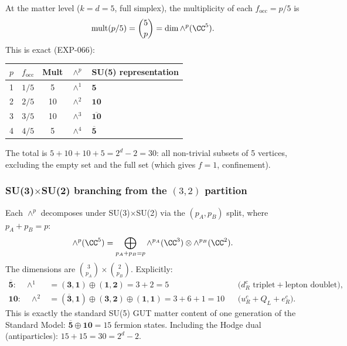 At the matter level ($k = d = 5$, full simplex), the multiplicity of each $f_\mathrm{occ} = p/5$ is
\begin{equation}
\mathrm{mult}(p/5) = \binom{5}{p} = \dim \wedge^p(\CC^5).
\end{equation}
This is exact (EXP-066):
\begin{center}
\begin{tabular}{ccccl}
\hline
$p$ & $f_\mathrm{occ}$ & Mult & $\wedge^p$ & SU(5) representation \\
\hline
1 & $1/5$ & 5 & $\wedge^1$ & $\mathbf{5}$ \\
2 & $2/5$ & 10 & $\wedge^2$ & $\mathbf{10}$ \\
3 & $3/5$ & 10 & $\wedge^3$ & $\overline{\mathbf{10}}$ \\
4 & $4/5$ & 5 & $\wedge^4$ & $\overline{\mathbf{5}}$ \\
\hline
\end{tabular}
\end{center}
The total is $5 + 10 + 10 + 5 = 2^d - 2 = 30$: all non-trivial subsets of 5 vertices, excluding the empty set and the full set (which gives $f = 1$, confinement).

\subsubsection{SU(3)$\times$SU(2) branching from the $(3,2)$ partition}

Each $\wedge^p$ decomposes under SU(3)$\times$SU(2) via the $(p_A, p_B)$ split, where $p_A + p_B = p$:
\begin{equation}
\wedge^p(\CC^5) = \bigoplus_{p_A + p_B = p} \wedge^{p_A}(\CC^3) \otimes \wedge^{p_B}(\CC^2).
\end{equation}
The dimensions are $\binom{3}{p_A} \times \binom{2}{p_B}$.  Explicitly:
\begin{align}
\overline{\mathbf{5}}: \quad \wedge^1 &= (\mathbf{3},\mathbf{1}) \oplus (\mathbf{1},\mathbf{2}) = 3 + 2 = 5
&&\text{(}d_R^c \text{ triplet} + \text{lepton doublet),} \\
\mathbf{10}: \quad \wedge^2 &= (\overline{\mathbf{3}},\mathbf{1}) \oplus (\mathbf{3},\mathbf{2}) \oplus (\mathbf{1},\mathbf{1}) = 3 + 6 + 1 = 10
&&\text{(}u_R^c + Q_L + e_R^c\text{).}
\end{align}
This is exactly the standard SU(5) GUT matter content of one generation of the Standard Model: $\overline{\mathbf{5}} \oplus \mathbf{10} = 15$ fermion states.  Including the Hodge dual (antiparticles): $15 + 15 = 30 = 2^d - 2$.

